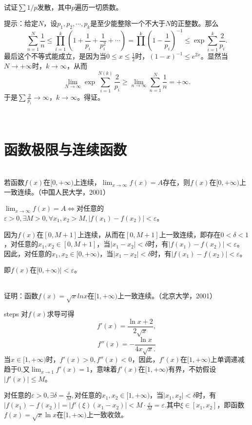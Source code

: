 \begin{example}
\hfill\\
试证$\sum1/p$发散，其中$p$遍历一切质数。

提示：给定$N$，设$p_1,p_2,\cdots,p_k$是至少能整除一个不大于$N$的正整数。那么$$\sum_{n=1}^N\frac{1}{n}\leq\prod_{i=1}^k(1+\frac{1}{p_i}+\frac{1}{p_i^2}+\cdots)=\prod^k(1-\frac{1}{p_i})^{-1}\leq\exp\sum_{i=1}^k\frac{2}{p_i}.$$
最后这个不等式能成立，是因为当$0\leq x\leq \frac{1}{2}$时，$(1-x)^{-1}\leq e^{2x}$。显然当$N\rightarrow+\infty$时，$k\to\infty$，从而
$$\lim_{N\to\infty}\exp\sum_{i=1}^{N(k)}\frac{2}{p_i}\geq\lim_{n\to\infty}\sum_{n=1}^N\frac{1}{n}=+\infty.$$
于是$\sum\frac{2}{p_i}\to\infty$，$k\to\infty$。得证。
\end{example}
\hfill\\
  \section{函数极限与连续函数}
  \begin{example}
  \hfill\\
  
  若函数$f(x)$在$[0,+\infty)$上连续，$\displaystyle\lim_{x\rightarrow\infty}f(x)=A$存在，则$f(x)$在$[0,+\infty)$上一致连续。（中国人民大学，2001）
 
  $\lim_{x\rightarrow\infty}f(x)=A\Leftrightarrow$对任意的$\varepsilon>0,\exists M>0,\forall x_1,x_2>M,|f(x_1)-f(x_2)|<\varepsilon$。
  
  因为$f(x)$在$[0,M+1]$上连续，从而在$[0,M+1]$上一致连续，即存在$0<\delta<1$，对任意的$x_1,x_2\in[0,M+1]$，当$|x_1-x_2|<\delta$时，有$|f(x_1)-f(x_2)|<\varepsilon$。因此，对任意的$x_1,x_2\in[0,+\infty)$，当$|x_1-x_2|<\delta$时，有$|f(x_1)-f(x_2)|<\varepsilon$。
  
  即$f(x)$在$[0,+\infty)|<\varepsilon$。
  \end{example}
  \begin{example}
  \hfill\\
  证明：函数$f(x)=\sqrt{x}lnx$在$[1,+\infty)$上一致连续。（北京大学，2001）
  
  steps
  对$f(x)$求导可得
  \[f'(x)=\frac{\ln x+2}{2\sqrt x},\]
  \[f''(x)=-\frac{\ln x}{4x\sqrt x.}\]
  当$x\in[1,+\infty)$时，$f'(x)>0,f''(x)<0$，因此，$f'(x)$在$[1,+\infty)$上单调递减趋于0,又$\lim_{x\rightarrow1}f'(x)=1$，意味着$f'(x)$在$[1,+\infty)$有界，不妨假设$|f'(x)|\leq M$。
  
  对任意的$\varepsilon>0,\exists\delta=\frac{\delta}M,$对任意的$x_1,x_2\in[1,+\infty)$，当$|x_1,x_2|<\delta$时，有$|f(x_1)-f(x_2)|=|f'(\xi)(x_1-x_2)|<M\cdot\frac{\varepsilon}{M}=\varepsilon.$其中$\xi\in[x_1,x_2]$，即函数$f(x)=\sqrt{x}\ln x$在$[1,+\infty)$上一致收敛。
  \end{example}

